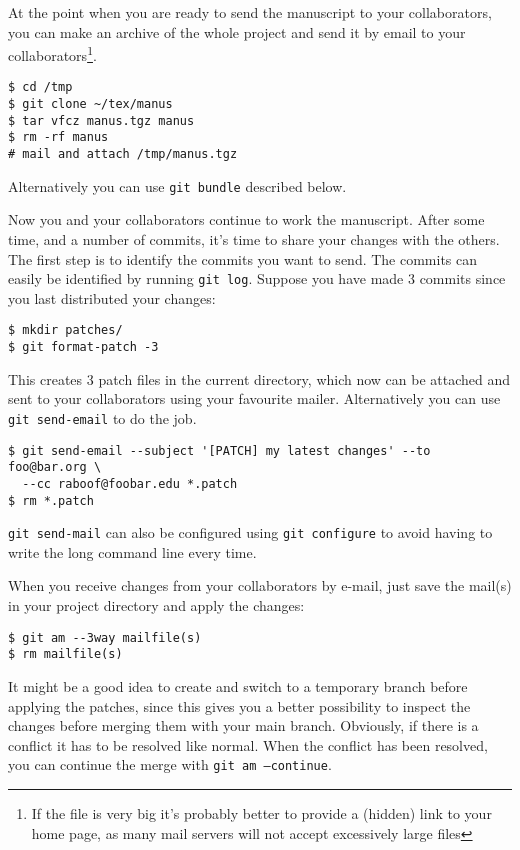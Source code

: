 \documentclass[a4paper,10pt]{article}
\begin{document}
At the point when you are ready to send the manuscript to your collaborators,
you can make an archive of the whole project and
send it by email to your collaborators\footnote{If the file is very big it's
probably better to provide a (hidden) link to your home page, as many mail
servers will not accept excessively large files}. 
\begin{verbatim}
$ cd /tmp
$ git clone ~/tex/manus
$ tar vfcz manus.tgz manus
$ rm -rf manus
# mail and attach /tmp/manus.tgz
\end{verbatim}
Alternatively you can use \texttt{git bundle} described below.

Now you and your collaborators continue to work the manuscript. After some
time, and a number of commits, it's time to share your changes with the 
others. The first step is to identify the commits you want to send. The
commits can easily be identified by running \texttt{git log}. Suppose you have
made 3 commits since you last distributed your changes:
\begin{verbatim}
$ mkdir patches/
$ git format-patch -3
\end{verbatim}
This creates 3 patch files in the current directory, which now can be attached
and sent to your collaborators using your favourite mailer. Alternatively you
can use \texttt{git send-email} to do the job.
\begin{verbatim}
$ git send-email --subject '[PATCH] my latest changes' --to foo@bar.org \
  --cc raboof@foobar.edu *.patch
$ rm *.patch
\end{verbatim}
\texttt{git send-mail} can also be configured using \texttt{git configure} to
avoid having to write the long command line every time.

When you receive changes from your collaborators by e-mail, just save the
mail(s) in your project directory and apply the changes:
\begin{verbatim}
$ git am --3way mailfile(s)
$ rm mailfile(s)
\end{verbatim}
It might be a good idea to create and switch to a temporary branch before 
applying the patches, since this gives you a better possibility to inspect the 
changes before merging them with your main branch. Obviously, if there is a
conflict it has to be resolved like normal. When the conflict has been
resolved, you can continue the merge with \texttt{git am --continue}.
\end{document}
